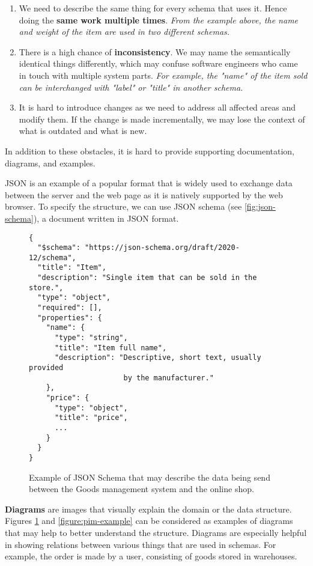 \begin{enumerate}
    \item We need to describe the same thing for every schema that uses it. Hence doing the \textbf{same work multiple times}. \textit{From the example above, the name and weight of the item are used in two different schemas.}
    \item There is a high chance of \textbf{inconsistency}. We may name the semantically identical things differently, which may confuse software engineers who came in touch with multiple system parts. \textit{For example, the "name" of the item sold can be interchanged with "label" or "title" in another schema.}
    \item It is hard to introduce changes as we need to address all affected areas and modify them. If the change is made incrementally, we may lose the context of what is outdated and what is new.
\end{enumerate}

In addition to these obstacles, it is hard to provide supporting documentation, diagrams, and examples.

\bigskip

JSON is an example of a popular format that is widely used to exchange data between the server and the web page as it is natively supported by the web browser. To specify the structure, we can use JSON schema (see \autoref{fig:json-schema}), a document written in JSON format.

\begin{figure}[h]
\begin{verbatim}
{
  "$schema": "https://json-schema.org/draft/2020-12/schema",
  "title": "Item",
  "description": "Single item that can be sold in the store.",
  "type": "object",
  "required": [],
  "properties": {
    "name": {
      "type": "string",
      "title": "Item full name",
      "description": "Descriptive, short text, usually provided
                      by the manufacturer."
    },
    "price": {
      "type": "object",
      "title": "price",
      ...
    }
  }
}
\end{verbatim}
\caption{Example of JSON Schema that may describe the data being send between the Goods management system and the online shop.}
\label{fig:json-schema}
\end{figure}

\textbf{Diagrams} are images that visually explain the domain or the data structure. Figures \ref{fig:json-schema} and \ref{figure:pim-example} can be considered as examples of diagrams that may help to better understand the structure. Diagrams are especially helpful in showing relations between various things that are used in schemas. For example, the order is made by a user, consisting of goods stored in warehouses.

